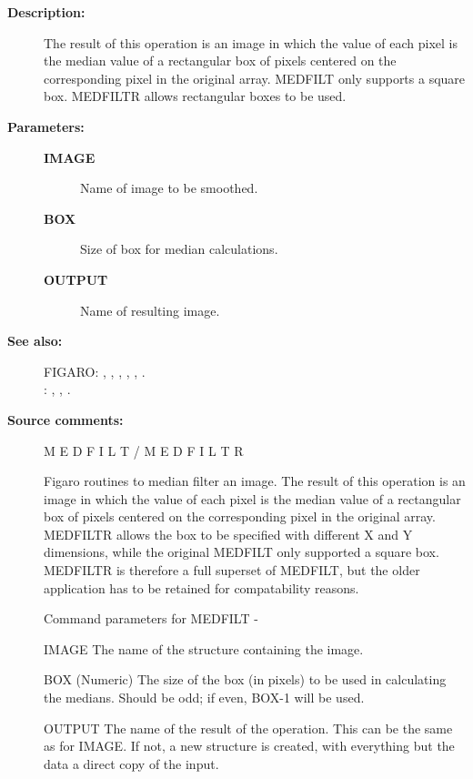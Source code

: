 \begin{description}
\begin{description}
\item [\textbf{Description:}]
 The result of this operation is an image in which the value of
 each pixel is the median value of a rectangular box of pixels
 centered on the corresponding pixel in the original array.
 MEDFILT only supports a square box.  MEDFILTR allows rectangular
 boxes to be used.

\item [\textbf{Parameters:}]
\begin{description}
\item [\textbf{IMAGE}]
 Name of image to be smoothed.
\item [\textbf{BOX}]
 Size of box for median calculations.
\item [\textbf{OUTPUT}]
 Name of resulting image.
\end{description}

\item [\textbf{See also:}]
FIGARO: , , , , , .\\
: , , .\\

\item [\textbf{Source comments:}]
\begin{terminalv}
 M E D F I L T   /    M E D F I L T R

 Figaro routines to median filter an image.  The result of
 this operation is an image in which the value of each pixel
 is the median value of a rectangular box of pixels centered on the
 corresponding pixel in the original array. MEDFILTR allows the
 box to be specified with different X and Y dimensions, while the
 original MEDFILT only supported a square box. MEDFILTR is therefore
 a full superset of MEDFILT, but the older application has to be
 retained for compatability reasons.

 Command parameters for MEDFILT -

 IMAGE    The name of the structure containing the image.

 BOX      (Numeric) The size of the box (in pixels) to be
          used in calculating the medians.  Should be odd;
          if even, BOX-1 will be used.

 OUTPUT   The name of the result of the operation.  This can
          be the same as for IMAGE.  If not, a new structure
          is created, with everything but the data a direct
          copy of the input.


\end{terminalv}
\end{description}
\end{description}
